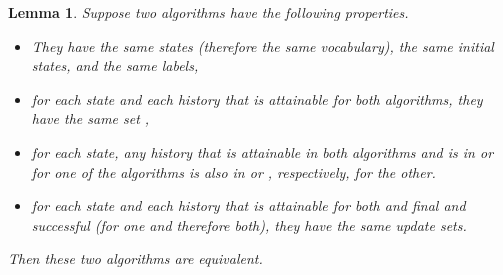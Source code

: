 \documentclass{LMCS}
\newtheorem{la}[thm]{Lemma}
\theoremstyle{definition}
\newenvironment{ls}{\begin{itemize}}{\end{itemize}}
\begin{document}
\begin{la}   \label{equiv-la}
Suppose two algorithms have the following properties.
\begin{ls}
  \item They have the same states (therefore the same vocabulary), the
  same initial states, and the same labels,
  \item for each state  and each history  that is attainable
  for both algorithms, they have the same set ,
  \item for each state, any history that is attainable in both
  algorithms and is in  or  for one of the
  algorithms is also in  or , respectively,
  for the other.
  \item for each state and each history that is attainable for both
  and final and successful (for one and therefore both), they have
  the same update sets.
\end{ls}
Then these two algorithms are equivalent.
\end{la}
\end{document}
